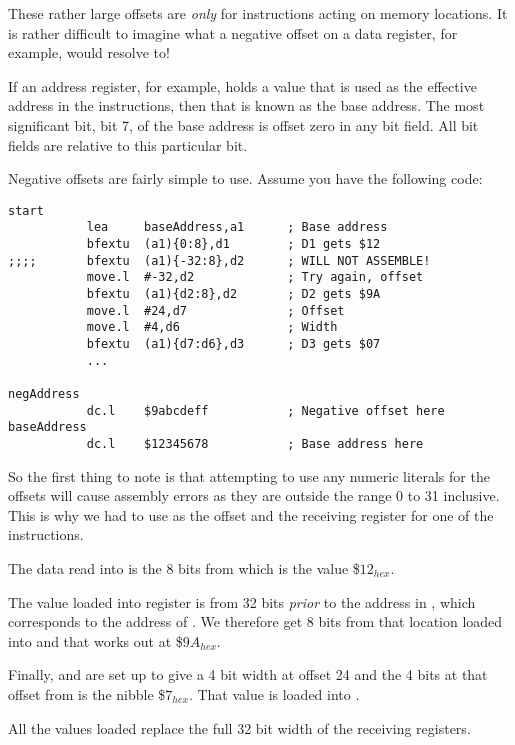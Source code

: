 These rather large offsets are \emph{only} for instructions acting on memory locations. It is rather difficult to imagine what a negative offset on a data register, for example, would resolve to!

If an address register, for example, holds a value that is used as the effective address in the instructions, then that is known as the base address. The most significant bit, bit 7, of the base address is offset zero in any bit field. All bit fields are relative to this particular bit.

Negative offsets are fairly simple to use. Assume you have the following code:

\begin{lstlisting}[firstnumber=1,caption={Bit Field Negative Offsets Example}]
start
           lea     baseAddress,a1      ; Base address
           bfextu  (a1){0:8},d1        ; D1 gets $12
;;;;       bfextu  (a1){-32:8},d2      ; WILL NOT ASSEMBLE!
           move.l  #-32,d2             ; Try again, offset
           bfextu  (a1){d2:8},d2       ; D2 gets $9A      
           move.l  #24,d7              ; Offset
           move.l  #4,d6               ; Width
           bfextu  (a1){d7:d6},d3      ; D3 gets $07
           ...

negAddress
           dc.l    $9abcdeff		   ; Negative offset here
baseAddress
           dc.l    $12345678           ; Base address here
\end{lstlisting}

So the first thing to note is that attempting to use any numeric literals for the offsets will cause assembly errors as they are outside the range 0 to 31 inclusive. This is why we had to use  as the offset and the receiving register for one of the instructions.

The data read into  is the 8 bits from  which is the value \$$12_{hex}$. 

The value loaded into register  is from 32 bits \emph{prior} to the address in , which corresponds to the address of . We therefore get 8 bits from that location loaded into  and that works out at \$$9A_{hex}$.

Finally,  and  are set up to give a 4 bit width at offset 24 and the 4 bits at that offset from  is the nibble \$$7_{hex}$. That value is loaded into .

All the values loaded replace the full 32 bit width of the receiving registers.

